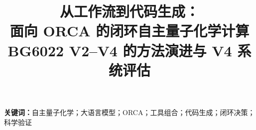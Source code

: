\documentclass[UTF8,fontset=fandol,a4paper,11pt]{ctexart}
\title{\vspace{-1.2cm}\bfseries 从工作流到代码生成：\\面向 ORCA 的闭环自主量子化学计算\\
 \large BG6022 V2--V4 的方法演进与 V4 系统评估}
\author{}
\date{}
\begin{document}
\maketitle
\vspace{-1.7cm}

\noindent\textbf{关键词：}自主量子化学；大语言模型；ORCA；工具组合；代码生成；闭环决策；科学验证

















\medskip
\renewcommand{\refname}{参考文献}
\begingroup
\footnotesize
\linespread{1.05}\selectfont
{}

\endgroup
\end{document}
